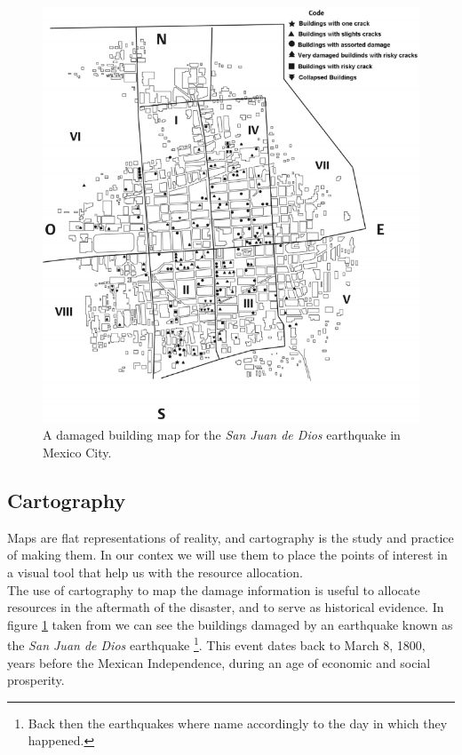 \begin{figure}[h]
  \centering
  \includegraphics[width=1\textwidth]{images/quake1800.png}
  \caption{A damaged building map for the \textit{San Juan de Dios} earthquake in Mexico City.}
  \label{fig:quake1800}
\end{figure}

\subsection{Cartography}

Maps are flat representations of reality, and cartography is the study and practice of making them. In our contex we will use them to place the points of interest in a visual tool that help us with the resource allocation.\\

The use of cartography to map the damage information is useful to allocate resources in the aftermath of the disaster, and to serve as historical evidence. In figure \ref{fig:quake1800} taken from \cite{AG3316} we can see the buildings damaged by an earthquake known as the \textit{San Juan de Dios} earthquake \footnote{Back then the earthquakes where name accordingly to the day in which they happened.}. This event dates back to March 8, 1800, years before the Mexican Independence, during an age of economic and social prosperity.\\

